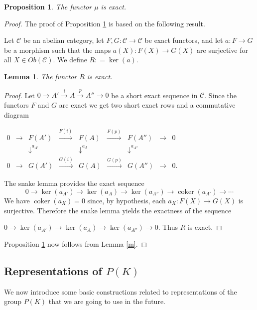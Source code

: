 \documentclass[11pt,a4paper,twoside]{amsart}
\newtheorem{lemma}[theorem]{Lemma}
\newtheorem{proposition}[theorem]{Proposition}
\theoremstyle{definition}
\theoremstyle{remark}
\newcommand{\mcC}{\mathcal C}
\newcommand{\sms}{\smallskip}
\begin{document}
\begin{proposition}\label{mmu} The functor $\mu$ is exact.
\end{proposition}
\begin{proof} The proof of Proposition \ref{mmu} is based on the following result.

\sms

Let $\mcC$ be an abelian category, let $F,G:\mcC\to\mcC$ be exact functors, and let $a:F\to G$ be a morphism such that the maps $a(X):F(X)\to G(X)$ are surjective for all $X\in Ob(\mcC)$. We define $R : = \ker (a)$.
\begin{lemma}\label{exact}The functor $R$ is exact.
\end{lemma}
\begin{proof}
Let
$0\to A'\xrightarrow{\,i\,} A\xrightarrow{\,p\,} A''\to0$
be a short exact sequence in $\mcC$. Since the functors $F$ and $G$ are exact we get two short exact rows and a commutative diagram

$\begin{array}{ccccccccc}
0&\to&F(A')&\xrightarrow{F(i)}&F(A)&\xrightarrow{F(p)}&F(A'')&\to&0\\
& &\downarrow^{a_{A'}}&&\downarrow^{a_A}&&\downarrow^{a_{A''}}&&\\
0&\to&G(A')&\xrightarrow{G(i)}&G(A)&\xrightarrow{G(p)}&G(A'')&\to&0.
\end{array}$

The snake lemma provides  the exact sequence
$$0\to\ker(a_{A'})\to\ker(a_A)\to\ker(a_{A''})\to\operatorname{coker}(a_{A'})\to\cdots$$
We have $\operatorname{coker}(a_X)=0$ since, by hypothesis, each $a_X:F(X)\to G(X)$ is surjective.  Therefore the snake lemma yields the exactness of the sequence

$0\to\ker(a_{A'})\to\ker(a_A)\to\ker(a_{A''})\to0$. Thus $R$ is exact.
\end{proof}
Proposition \ref{mmu} now follows from Lemma \ref{m}.

\end{proof}

\subsection{Representations of  $P(K)$} 
We now introduce some basic constructions related to representations of the group $P(K)$ that we are going to use in the future.
\end{document}

